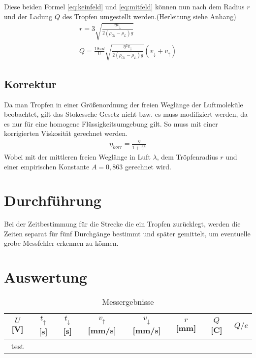 Diese beiden Formel \ref{eq:keinfeld} und \ref{eq:mitfeld} können nun nach dem Radius $r$ und der Ladung $Q$ des Tropfen umgestellt werden.(Herleitung siehe Anhang)
\begin{gather}
r=3\sqrt{\frac{\eta v_{\downarrow}}{2(\rho_{Öl}-\rho_L)g}}\label{eq:radius}\\
Q = \frac{18 \pi d}{U}\sqrt{\frac{\eta^3 v_{\downarrow}}{2(\rho_{Öl}-\rho_L)g}}(v_{\downarrow}+v_{\uparrow})
\end{gather}
\subsection{Korrektur}
Da man Tropfen in einer Größenordnung der freien Weglänge der Luftmoleküle beobachtet, gilt das Stokessche Gesetz nicht bzw. es muss modifiziert werden, da es nur für eine homogene Flüssigkeitsumgebung gilt. So muss mit einer korrigierten Viskosität gerechnet werden.
\begin{eqnarray}
\eta_{korr}=\frac{\eta}{1+\frac{A\lambda}{r}}
\end{eqnarray}
Wobei mit der mittleren freien Weglänge in Luft $\lambda$, dem Tröpfenradius $r$ und einer empirischen Konstante $A=0,863$ gerechnet wird.
\section{Durchführung}
Bei der Zeitbestimmung für die Strecke die ein Tropfen zurücklegt, werden die Zeiten separat für fünf Durchgänge bestimmt und später gemittelt, um eventuelle grobe Messfehler erkennen zu können. 
\section{Auswertung}
\begin{table}
  \centering
  \begin{tabular}{c c c c c c c c} \toprule
    $U$ [\si{V}] & $t_{\uparrow}$ [\si{s}] & $t_{\downarrow}$ [\si{s}] & $v_{\uparrow}$ [\si{mm/s}] & $v_{\downarrow}$ [\si{mm/s}] & $r$ [\si{mm}] & $Q$ [\si{C}] & $Q/e$ \\ \midrule

    test \\ \bottomrule
  \end{tabular}
  \caption{Messergebnisse}
  \label{tab:ergebnisse}
\end{table}

